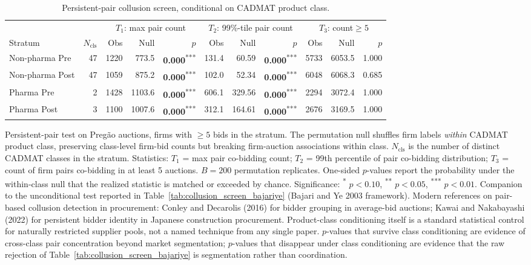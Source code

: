 \begin{table}[!htbp]
\centering
\begin{threeparttable}
\caption{Persistent-pair collusion screen, conditional on CADMAT product class.}
\label{tab:collusion_screen_pair_classcond}
\footnotesize
\setlength{\tabcolsep}{4pt}
\providecommand{\sym}[1]{\textsuperscript{#1}}
\begin{tabular}{lrrrrrrrrrr}
\toprule
 & & \multicolumn{3}{c}{$T_1$: max pair count} & \multicolumn{3}{c}{$T_2$: 99\%-tile pair count} & \multicolumn{3}{c}{$T_3$: count$\geq 5$} \\
\cmidrule(lr){3-5}\cmidrule(lr){6-8}\cmidrule(lr){9-11}
Stratum & $N_{\mathrm{cls}}$ & Obs & Null & $p$ & Obs & Null & $p$ & Obs & Null & $p$ \\
\midrule
Non-pharma Pre & 47 & 1220 & 773.5 & \textbf{0.000}\sym{***} & 131.4 & 60.59 & \textbf{0.000}\sym{***} & 5733 & 6053.5 & 1.000 \\
Non-pharma Post & 47 & 1059 & 875.2 & \textbf{0.000}\sym{***} & 102.0 & 52.34 & \textbf{0.000}\sym{***} & 6048 & 6068.3 & 0.685 \\
Pharma Pre & 2 & 1428 & 1103.6 & \textbf{0.000}\sym{***} & 606.1 & 329.56 & \textbf{0.000}\sym{***} & 2294 & 3072.4 & 1.000 \\
Pharma Post & 3 & 1100 & 1007.6 & \textbf{0.000}\sym{***} & 312.1 & 164.61 & \textbf{0.000}\sym{***} & 2676 & 3169.5 & 1.000 \\
\bottomrule
\end{tabular}
\begin{tablenotes}[flushleft]\footnotesize
\item Persistent-pair test on Preg\~ao auctions, firms with $\geq 5$ bids in the stratum. The permutation null shuffles firm labels \emph{within} CADMAT product class, preserving class-level firm-bid counts but breaking firm-auction associations within class. $N_{\mathrm{cls}}$ is the number of distinct CADMAT classes in the stratum. Statistics: $T_1$ = max pair co-bidding count; $T_2$ = 99th percentile of pair co-bidding distribution; $T_3$ = count of firm pairs co-bidding in at least 5 auctions. $B = 200$ permutation replicates. One-sided $p$-values report the probability under the within-class null that the realized statistic is matched or exceeded by chance. Significance: \sym{*} $p<0.10$, \sym{**} $p<0.05$, \sym{***} $p<0.01$. Companion to the unconditional test reported in Table~\ref{tab:collusion_screen_bajariye} (Bajari and Ye 2003 framework). Modern references on pair-based collusion detection in procurement: Conley and Decarolis (2016) for bidder grouping in average-bid auctions; Kawai and Nakabayashi (2022) for persistent bidder identity in Japanese construction procurement. Product-class conditioning itself is a standard statistical control for naturally restricted supplier pools, not a named technique from any single paper. $p$-values that survive class conditioning are evidence of cross-class pair concentration beyond market segmentation; $p$-values that disappear under class conditioning are evidence that the raw rejection of Table~\ref{tab:collusion_screen_bajariye} is segmentation rather than coordination.
\end{tablenotes}
\end{threeparttable}
\end{table}
